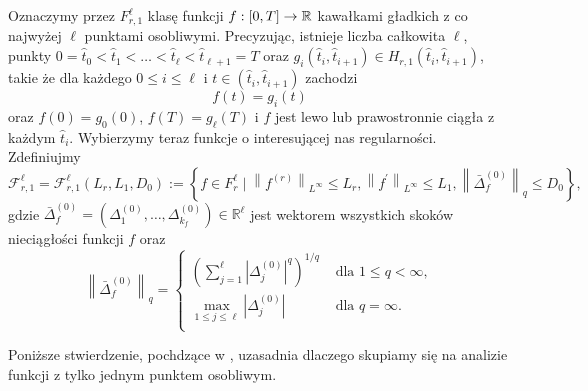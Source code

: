 \documentclass[oik, pdftex, robocza, man]{mgrwms}
\begin{document}
    Oznaczymy przez $F_{r, 1}^{\ell}$ klasę funkcji $f: [0,T] \rightarrow \mathbb{R}$ kawałkami gładkich z co najwyżej $\ell$ punktami osobliwymi. Precyzując, istnieje liczba całkowita $\ell$, punkty $0 = \hat{t}_{0} < \hat{t}_{1} < \ldots < \hat{t}_{\ell} < \hat{t}_{\ell + 1} = T$ oraz $g_{i}(\hat{t}_{i}, \hat{t}_{i+1}) \in H_{r, 1}(\hat{t}_{i},\hat{t}_{i+1})$, takie że dla każdego $0 \leq i \leq \ell$ i $t \in (\hat{t}_{i}, \hat{t}_{i+1})$ zachodzi
    \begin{equation*}
        f(t) = g_{i}(t)
    \end{equation*}
    oraz $f(0) = g_{0}(0)$, $f(T) = g_{\ell}(T)$ i $f$ jest lewo lub prawostronnie ciągła z każdym $\hat{t}_{i}$.
    Wybierzymy teraz funkcje o interesującej nas regularności. Zdefiniujmy
    \begin{equation*}
        \mathcal{F}_{r, 1}^{\ell}=\mathcal{F}_{r, 1}^{\ell}\left(L_{r}, L_{1}, D_{0}\right):=\left\{f \in F_{r}^{\ell} \mid\left\|f^{(r)}\right\|_{L^{\infty}} \leq L_{r},\left\|f^{\prime}\right\|_{L^{\infty}} \leq L_{1},\left\|\bar{\Delta}_{f}^{(0)}\right\|_{q} \leq D_{0}\right\},
    \end{equation*}
    gdzie $\bar{\Delta}_{f}^{(0)}=\left(\Delta_{1}^{(0)}, \ldots, \Delta_{k_{f}}^{(0)}\right) \in \mathbb{R}^{\ell}$ jest wektorem wszystkich skoków nieciągłości funkcji $f$ oraz
    \begin{equation*}
        \left\|\bar{\Delta}_{f}^{(0)}\right\|_{q}=\begin{cases}
            \displaystyle \left(\sum_{j=1}^{\ell}\left|\Delta_{j}^{(0)}\right|^{q}\right)^{1 / q}   & \text { dla } 1 \leq q< \infty, \\
            \displaystyle \max _{1 \leq j \leq \ell}\left|\Delta_{j}^{(0)}\right|                   & \text { dla } q = \infty. \\
        \end{cases}
    \end{equation*}
    
    Poniższe stwierdzenie, pochdzące w \cite{PoA}, uzasadnia dlaczego skupiamy się na analizie funkcji z tylko jednym punktem osobliwym.
\end{document}
